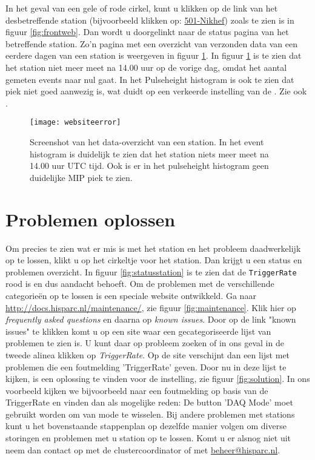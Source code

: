 In het geval van een gele of rode cirkel, kunt u klikken op de link van het
desbetreffende station (bijvoorbeeld klikken op: \underline{501-Nikhef}) zoals te zien is in figuur \ref{fig:frontweb}. 
Dan wordt u doorgelinkt naar de status pagina van het betreffende station. Zo'n
pagina met een overzicht van verzonden data van een eerdere dagen
van een station is weergeven in figuur \ref{fig:websiteerror}. In figuur \ref{fig:websiteerror}
is te zien dat het station niet meer meet na 14.00 uur op de vorige dag,  omdat het aantal
gemeten events naar nul gaat. In het Pulseheight histogram is ook te zien
dat \mip piek niet goed aanwezig is, wat duidt op een verkeerde
instelling van de \pmt. Zie ook \cite{inregelen}.

\begin{figure} 
\centering 
\texttt{[image: websiteerror]}
\caption{Screenshot van het data-overzicht van een
station. In het event histogram is duidelijk te zien dat het station
niets meer meet na 14.00 uur UTC tijd. Ook is er in het pulseheight histogram
geen duidelijke MIP piek te zien.} \label{fig:websiteerror} 
\end{figure}

\section{Problemen oplossen}

Om precies te zien wat er mis is met het station en het probleem
daadwerkelijk op te lossen, klikt u op het cirkeltje voor het station.
Dan krijgt u een status en problemen overzicht. 
In figuur \ref{fig:statusstation} is te zien dat de \verb|TriggerRate|
rood is en dus aandacht behoeft.
Om de problemen met de verschillende categorieën op te lossen is een speciale website ontwikkeld.
Ga naar \url{http://docs.hisparc.nl/maintenance/}, zie figuur \ref{fig:maintenance}. 
Klik hier op \emph{frequently asked questions} en daarna op \emph{known issues}. 
Door op de link "known issues"  te klikken komt u op een site waar een gecategoriseerde lijst van problemen te zien is. 
U kunt daar op probleem zoeken of in ons geval in de tweede alinea klikken op \emph{TriggerRate}. 
Op de site verschijnt dan een lijst met problemen die een foutmelding 'TriggerRate' geven. 
Door nu in deze lijst te kijken, is een oplossing te vinden voor de instelling, zie figuur \ref{fig:solution}.
In ons voorbeeld kijken we bijvoorbeeld naar een foutmelding op basis van de TriggerRate en vinden dan als mogelijke reden:
De button 'DAQ Mode'  moet gebruikt worden om van mode te wisselen.
Bij andere problemen met stations kunt u het bovenstaande stappenplan op dezelfde manier volgen om diverse storingen en problemen met u station op te lossen.
Komt u er alsnog niet uit neem dan contact op met de clustercoordinator of met \url{beheer@hisparc.nl}.
 

